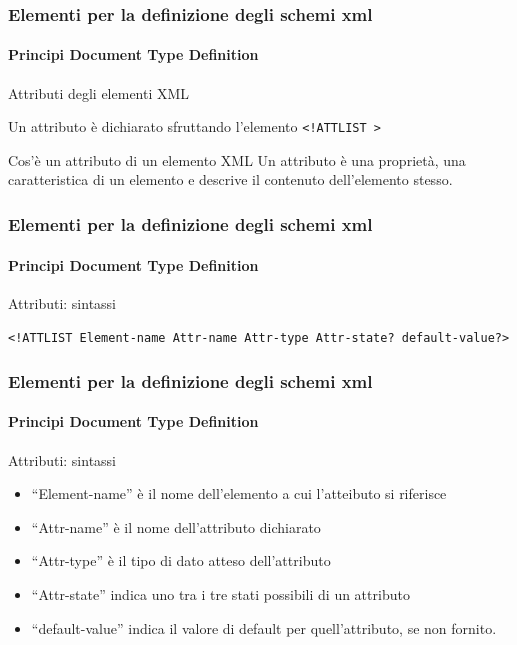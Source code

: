 \begin{frame}
    \frametitle{Elementi per la definizione degli schemi xml}
    \framesubtitle{Principi Document Type Definition}
    \addtocounter{nframe}{1}

    \begin{block}{Attributi degli elementi XML}
    \begin{center} Un attributo è dichiarato sfruttando l'elemento \texttt{<!ATTLIST >} \end{center}
    \end{block}

    \begin{block}{Cos'è un attributo di un elemento XML}
        Un attributo è una proprietà, una caratteristica di un elemento e descrive il contenuto dell'elemento stesso.
    \end{block}

\end{frame}

\begin{frame}
    \frametitle{Elementi per la definizione degli schemi xml}
    \framesubtitle{Principi Document Type Definition}
    \addtocounter{nframe}{1}

    \begin{block}{Attributi: sintassi}
    \begin{center} \texttt{<!ATTLIST Element-name Attr-name Attr-type Attr-state? default-value?>} \end{center}
    \end{block}

\end{frame}


\begin{frame}
    \frametitle{Elementi per la definizione degli schemi xml}
    \framesubtitle{Principi Document Type Definition}
    \addtocounter{nframe}{1}

    \begin{block}{Attributi: sintassi}
        \begin{itemize}
            \item ``Element-name'' è il nome dell'elemento a cui l'atteibuto si riferisce
            \item ``Attr-name'' è il nome dell'attributo dichiarato
            \item ``Attr-type'' è il tipo di dato atteso dell'attributo
            \item ``Attr-state'' indica uno tra i tre stati possibili di un attributo 
            \item ``default-value'' indica il valore di default per quell'attributo, se non fornito.
        \end{itemize}
    \end{block}

\end{frame}




